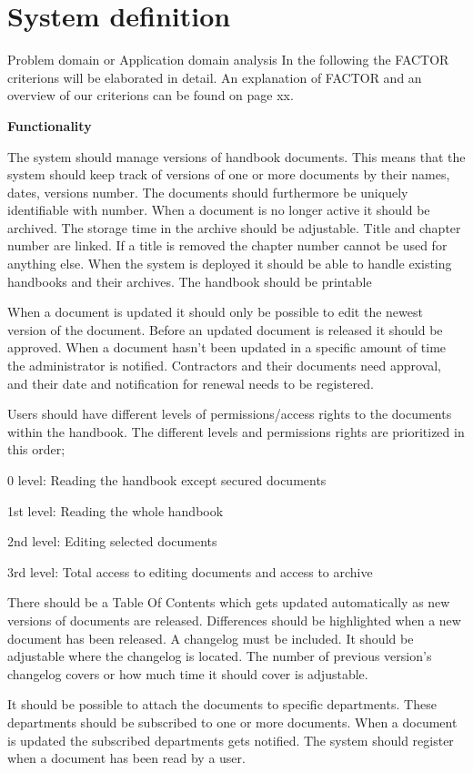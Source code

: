 \section{System definition}

Problem domain or Application domain analysis
In the following the FACTOR criterions will be elaborated in detail. An explanation of FACTOR and an overview of our criterions can be found on page xx.

\textbf{Functionality}

The system should manage versions of handbook documents. This means that the system should keep track of versions of one or more documents by their names, dates, versions number. The documents should furthermore be uniquely identifiable with number. When a document is no longer active it should be archived. The storage time in the archive should be adjustable. Title and chapter number are linked. If a title is removed the chapter number cannot be used for anything else. When the system is deployed it should be able to handle existing handbooks and their archives. The handbook should be printable

When a document is updated it should only be possible to edit the newest version of the document. Before an updated document is released it should be approved. When a document hasn’t been updated in a specific amount of time the administrator is notified. Contractors and their documents need approval, and their date and notification for renewal needs to be registered.

Users should have different levels of permissions/access rights to the documents within the handbook. The different levels and permissions rights are prioritized in this order;

0 level: Reading the handbook except secured documents

1st level: Reading the whole handbook

2nd level: Editing selected documents

3rd level: Total access to editing documents and access to archive

There should be a Table Of Contents which gets updated automatically as new versions of documents are released. Differences should be highlighted when a new document has been released. A changelog must be included. It should be adjustable where the changelog is located. The number of previous version’s changelog covers or how much time it should cover is adjustable.

It should be possible to attach the documents to specific departments. These departments should be subscribed to one or more documents. When a document is updated the subscribed departments gets notified. The system should register when a document has been read by a user.

